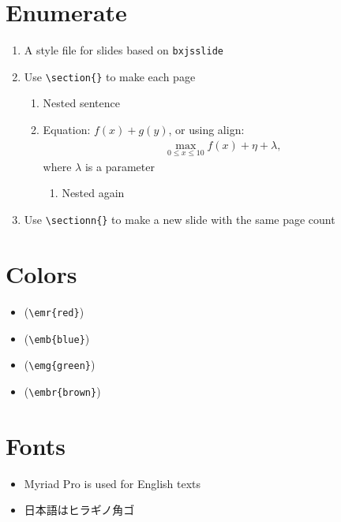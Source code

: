 \documentclass[xelatex,ja=standard,jafont=hiragino-pron,fleqn,no-math,25pt,paper={190.5truemm}{254truemm},english]{bxjsslidemd}
\begin{document}
\section{Enumerate}
\begin{enumerate}
 \item A style file for slides based on \texttt{bxjsslide}
 \item Use \verb|\section{}| to make each page
       \begin{enumerate}
	\item Nested sentence
	\item Equation: $f(x) + g(y)$, or using align:
	      \begin{align*}
	       \max_{0 \le x \le 10} f(x) + \eta + \lambda,
	      \end{align*}
	      where $\lambda$ is a parameter
	      \begin{enumerate}
	       \item Nested again
	      \end{enumerate}
       \end{enumerate}
 \item Use \verb|\sectionn{}| to make a new slide with the same page count
\end{enumerate}

\section{Colors}
\begin{itemize}
 \item {} (\verb|\emr{red}|)
 \item {} (\verb|\emb{blue}|)
 \item {} (\verb|\emg{green}|)
 \item {} (\verb|\embr{brown}|)
\end{itemize}

\section{Fonts}
\begin{itemize}
 \item Myriad Pro is used for English texts
 \item 日本語はヒラギノ角ゴ
\end{itemize}
\end{document}

